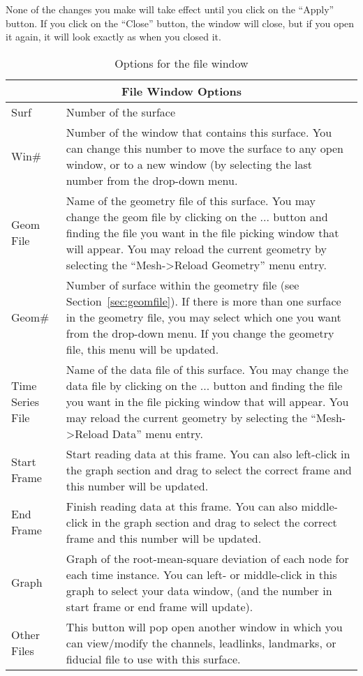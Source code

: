 None of the changes you make will take effect until you click on the
``Apply'' button.  If you click on the ``Close'' button, the window will
close, but if you open it again, it will look exactly as when you closed
it.

\begin{table}[htbp]
\begin{center}
\begin{tabular}{|l|p{4in}|} \hline
    \multicolumn{2}{|c|}{\textbf{File Window Options}} \\ \hline\hline
    Surf      &      Number of the surface \\ \hline
    Win\#      &      Number of the window that contains this surface.
    You can change this number to move the surface to any
    open window, or to a new window (by selecting the last
    number from the drop-down menu. \\ \hline
    Geom File &      Name of the geometry file of this surface.  You
    may change the geom file by clicking on the
    ... button and finding the file you  
    want in the file picking window that will
    appear. You may reload the current geometry by
    selecting the ``Mesh->Reload Geometry'' 
    menu entry. \\ \hline
    Geom\#     &      Number of surface within the geometry file (see
    Section~\ref{sec:geomfile}). 
    If there is more than one surface in the geometry
    file, you may select which one you want from the
    drop-down menu.  If you change the geometry file, 
    this menu will be updated. \\ \hline
    Time Series File      &   Name of the data file of this surface.
    You may change the  
    data file by clicking on the ... button and
    finding the file you  
    want in the file picking window that will
    appear. You may reload 
    the current geometry by selecting the
    ``Mesh->Reload Data'' 
    menu entry. \\ \hline
    Start Frame           &   Start reading data at this frame.  You
    can also left-click 
    in the graph section and drag to select the
    correct frame and this  
    number will be updated. \\ \hline
    End Frame             &       Finish reading data at this frame.
    You can also middle-click 
    in the graph section and drag to select the
    correct frame and this number will be updated. \\
    \hline 
    Graph     &       Graph of the root-mean-square deviation of each
    node for each time instance. You can left- or
    middle-click in this graph to select your data window, (and the
    number in start frame or end frame will update). \\ \hline 
    Other Files           &       This button will pop open another
    window in which you can view/modify the channels, leadlinks, 
    landmarks, or fiducial file to use with this surface. \\ \hline 
\end{tabular}
\end{center}
\caption{\label{table:filewindow} Options for the file window}    
\end{table}

